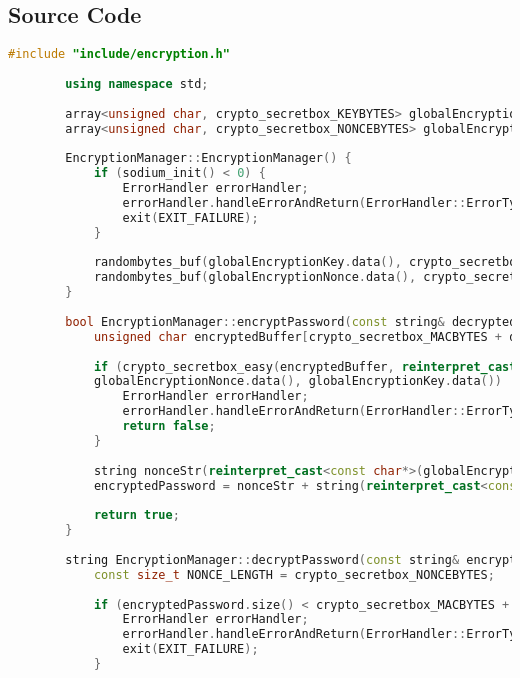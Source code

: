 \documentclass{article}
\begin{document}
	\subsection*{Source Code}
	\begin{mdframed}[backgroundcolor=background, hidealllines=false, innerleftmargin=15pt, innerrightmargin=5pt, innertopmargin=0pt, innerbottommargin=-5pt]
	\begin{lstlisting}[language=C++]
		#include "include/encryption.h"
		
		using namespace std;
		
		array<unsigned char, crypto_secretbox_KEYBYTES> globalEncryptionKey;
		array<unsigned char, crypto_secretbox_NONCEBYTES> globalEncryptionNonce;
		
		EncryptionManager::EncryptionManager() {
			if (sodium_init() < 0) {
				ErrorHandler errorHandler;
				errorHandler.handleErrorAndReturn(ErrorHandler::ErrorType::LIBSODIUM_INIT_ERROR);
				exit(EXIT_FAILURE);
			}
			
			randombytes_buf(globalEncryptionKey.data(), crypto_secretbox_KEYBYTES);
			randombytes_buf(globalEncryptionNonce.data(), crypto_secretbox_NONCEBYTES);
		}
		
		bool EncryptionManager::encryptPassword(const string& decryptedPassword, string& encryptedPassword) {
			unsigned char encryptedBuffer[crypto_secretbox_MACBYTES + decryptedPassword.size()];
			
			if (crypto_secretbox_easy(encryptedBuffer, reinterpret_cast<const unsigned char*>(decryptedPassword.c_str()), decryptedPassword.size(),
			globalEncryptionNonce.data(), globalEncryptionKey.data()) != 0) {
				ErrorHandler errorHandler;
				errorHandler.handleErrorAndReturn(ErrorHandler::ErrorType::EMAIL_PASSWORD_ENCRYPTION_ERROR);
				return false;
			}
			
			string nonceStr(reinterpret_cast<const char*>(globalEncryptionNonce.data()), globalEncryptionNonce.size());
			encryptedPassword = nonceStr + string(reinterpret_cast<const char*>(encryptedBuffer), sizeof(encryptedBuffer));
			
			return true;
		}
		
		string EncryptionManager::decryptPassword(const string& encryptedPassword) {
			const size_t NONCE_LENGTH = crypto_secretbox_NONCEBYTES;
			
			if (encryptedPassword.size() < crypto_secretbox_MACBYTES + NONCE_LENGTH) {
				ErrorHandler errorHandler;
				errorHandler.handleErrorAndReturn(ErrorHandler::ErrorType::EMAIL_PASSWORD_ENCRYPTION_FORMAT_ERROR);
				exit(EXIT_FAILURE);
			}
			

\end{lstlisting}
\end{mdframed}
\end{document}
